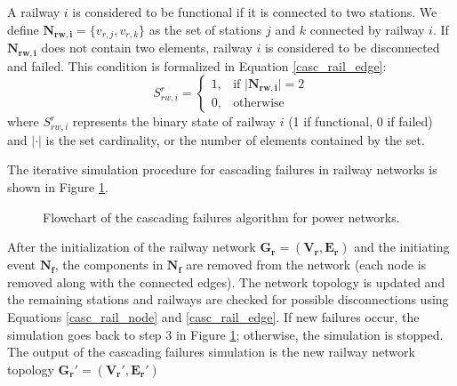 \documentclass[review]{elsarticle}
\begin{document}
	A railway $i$ is considered to be functional if it is connected to two stations. We define $\mathbf{N_{rw,i}} = \{ v_{r,j}, v_{r,k} \}$ as the set of stations $j$ and $k$ connected by railway $i$. If $\mathbf{N_{rw,i}}$ does not contain two elements, railway $i$ is considered to be disconnected and failed. This condition is formalized in Equation \ref{casc_rail_edge}:
		\begin{equation}
	     S^r_{rw,i} =
  \begin{cases}
    1, & \text{if $\mathbf{|N_{rw,i}}|=2$}\\
    0, & \text{otherwise}
  \end{cases}
  \label{casc_rail_edge}
	\end{equation}
where $S^r_{rw,i}$ represents the binary state of railway $i$ (1 if functional, 0 if failed) and $|\cdot|$ is the set cardinality, or the number of elements contained by the set.

The iterative simulation procedure for cascading failures in railway networks is shown in Figure \ref{algo_rail}.
\begin{figure}[h]
	\centering
	\caption{Flowchart of the cascading failures algorithm for power networks.}
	\label{algo_rail}
\end{figure}
After the initialization of the railway network $\mathbf{G_r}=(\mathbf{V_r},\mathbf{E_r})$ and the initiating event $\mathbf{N_f}$, the components in $\mathbf{N_f}$ are removed from the network (each node is removed along with the connected edges). The network topology is updated and the remaining stations and railways are checked for possible disconnections using Equations \eqref{casc_rail_node} and \eqref{casc_rail_edge}. If new failures occur, the simulation goes back to step 3 in Figure \ref{algo_rail}; otherwise, the simulation is stopped. The output of the cascading failures simulation is the new railway network topology $\mathbf{G_r'}=(\mathbf{V_r'},\mathbf{E_r'})$
	
\end{document}
